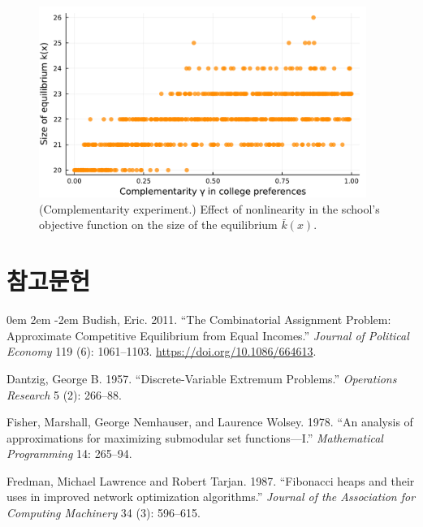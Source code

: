 \documentclass[12pt]{article} %
\newif\ifEN
\theoremstyle{definition}
\theoremstyle{definition}
\begin{document}
\begin{figure}[h!]
  \begin{center}\includegraphics[width=0.95\textwidth]{./TwoSchoolModels/CombiPref-complementarity/complementarity-k.pdf}\end{center}
  \caption{(Complementarity experiment.) Effect of nonlinearity in the school's objective function on the size of the equilibrium $\bar k(x)$.}
\end{figure}



\pagebreak
\ifEN \section{References} \else \section{참고문헌} \fi
\noindent

\parskip 0em
\leftskip 2em
\parindent -2em
Budish, Eric. 2011. ``The Combinatorial Assignment Problem: Approximate Competitive Equilibrium from Equal Incomes.'' \emph{Journal of Political Economy} 119 (6): 1061--1103. \url{https://doi.org/10.1086/664613}. 

Dantzig, George B. 1957. ``Discrete-Variable Extremum Problems.'' \emph{Operations Research} 5 (2): 266--88.

Fisher, Marshall, George Nemhauser, and Laurence Wolsey. 1978. ``An analysis of approximations for maximizing submodular set functions—I.'' \emph{Mathematical Programming} 14: 265--94. 

Fredman, Michael Lawrence and Robert Tarjan. 1987. ``Fibonacci heaps and their uses in improved network optimization algorithms.'' \emph{Journal of the Association for Computing Machinery} 34 (3): 596--615.
\end{document}
